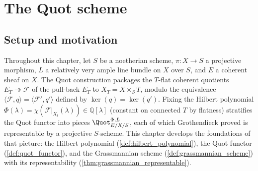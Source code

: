 \chapter{The Quot scheme}
\label{chap:Picard_QuotScheme}

%

\section{Setup and motivation}
\label{sec:quot_setup}

Throughout this chapter, let \(S\) be a noetherian scheme, \(\pi : X \to S\) a
projective morphism, \(L\) a relatively very ample line bundle on \(X\) over \(S\),
and \(E\) a coherent sheaf on \(X\). The Quot construction packages the
\(T\)-flat coherent quotients \(E_T \twoheadrightarrow \mathcal{F}\) of the
pull-back \(E_T\) to \(X_T = X \times_S T\), modulo the equivalence
\(\langle \mathcal{F}, q\rangle = \langle \mathcal{F}', q'\rangle\) defined by
\(\ker(q) = \ker(q')\). Fixing the Hilbert polynomial
\(\Phi(\lambda) = \chi(\mathcal{F}|_{X_t}(\lambda)) \in \mathbb{Q}[\lambda]\)
(constant on connected \(T\) by flatness)
stratifies the Quot functor into pieces \(\Quot^{\Phi,L}_{E/X/S}\), each of
which Grothendieck proved is representable by a projective \(S\)-scheme.
This chapter develops the foundations of that picture: the Hilbert
polynomial (\cref{def:hilbert_polynomial}), the Quot functor
(\cref{def:quot_functor}), and the Grassmannian scheme
(\cref{def:grassmannian_scheme}) with its representability
(\cref{thm:grassmannian_representable}).


